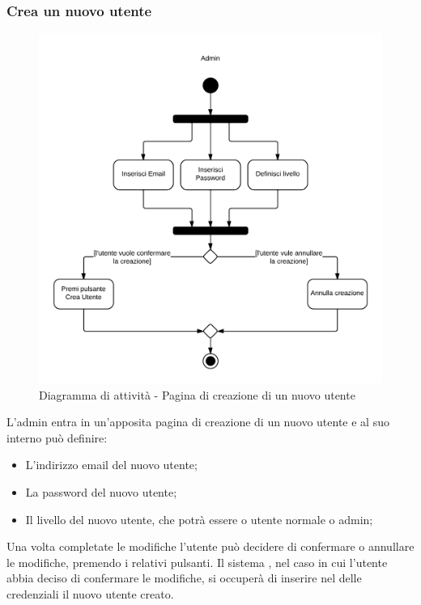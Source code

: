 \subsubsection{Crea un nuovo utente}

\begin{figure}[H]
\centering
\includegraphics[scale=0.2]{uml/attivita/MaaP - Crea nuovo utente.png}
\caption{Diagramma di attività - Pagina di creazione di un nuovo utente}
\end{figure}

L'admin entra in un'apposita pagina di creazione di un nuovo utente e al suo interno può definire:

\begin{itemize}

	\item L'indirizzo email del nuovo utente;
	\item La password del nuovo utente;
	\item Il livello del nuovo utente, che potrà essere o utente normale o admin;

\end{itemize}

Una volta completate le modifiche l'utente può decidere di confermare o annullare le modifiche, premendo i relativi pulsanti. Il sistema , nel caso in cui l'utente abbia deciso di confermare le modifiche, si occuperà di inserire nel  delle credenziali il nuovo utente creato.

